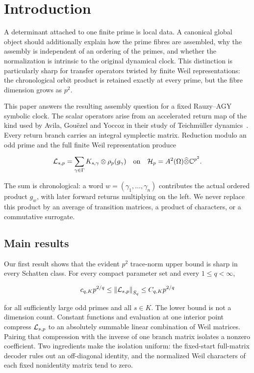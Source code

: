 \section{Introduction}
\label{sec:introduction}

A determinant attached to one finite prime is local data.  A canonical
global object should additionally explain how the prime fibres are assembled,
why the assembly is independent of an ordering of the primes, and whether the
normalization is intrinsic to the original dynamical clock.  This distinction
is particularly sharp for transfer operators twisted by finite Weil
representations: the chronological orbit product is retained exactly at every
prime, but the fibre dimension grows as \(p^2\).

This paper answers the resulting assembly question for a fixed Rauzy--AGY
symbolic clock.  The scalar operators arise from an accelerated return map of
the kind used by Avila, Gou\"ezel and Yoccoz in their study of Teichm\"uller
dynamics~\citep{agy2006}.  Every return branch carries an integral symplectic
matrix.  Reduction modulo an odd prime and the full finite Weil representation
produce

\begin{equation}
 \mathcal L_{s,p}
 =\sum_{\gamma\in\Gamma}K_{s,\gamma}\otimes
   \rho_p(g_\gamma)
 \quad\text{on}\quad
 \mathcal H_p=A^2(\Omega)\widehat\otimes\mathbb C^{p^2}.
 \label{eq:local-operator-intro}
\end{equation}

The sum is chronological: a word
\(w=(\gamma_1,\ldots,\gamma_n)\) contributes the actual ordered product
\(g_w\), with later forward returns multiplying on the left.  We never replace
this product by an average of transition matrices, a product of characters,
or a commutative surrogate.

\subsection{Main results}

Our first result shows that the evident \(p^2\) trace-norm upper bound is
sharp in every Schatten class.  For every compact parameter set and every
\(1\leq q<\infty\),

\begin{equation}
 c_{q,K}p^{2/q}
 \leq \left\lVert\mathcal L_{s,p}\right\rVert_{S_{q}}
 \leq C_{q,K}p^{2/q}
 \label{eq:intro-sharp}
\end{equation}

for all sufficiently large odd primes and all \(s\in K\).  The lower bound
is not a dimension count.  Constant functions and evaluation at one interior
point compress \(\mathcal L_{s,p}\) to an absolutely summable linear combination of
Weil matrices.  Pairing that compression with the inverse of one branch
matrix isolates a nonzero coefficient.  Two ingredients make the isolation
uniform: the fixed-start full-matrix decoder rules out an off-diagonal
identity, and the normalized Weil characters of each fixed nonidentity
matrix tend to zero.

